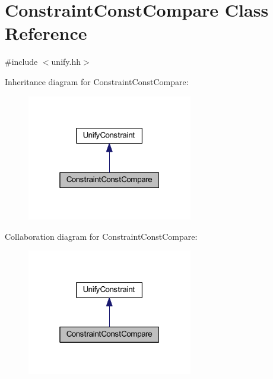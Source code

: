 \hypertarget{class_constraint_const_compare}{}\section{Constraint\+Const\+Compare Class Reference}
\label{class_constraint_const_compare}


{\ttfamily \#include $<$unify.\+hh$>$}



Inheritance diagram for Constraint\+Const\+Compare\+:
\nopagebreak
\begin{figure}[H]
\begin{center}
\leavevmode
\includegraphics[width=205pt]{class_constraint_const_compare__inherit__graph}
\end{center}
\end{figure}


Collaboration diagram for Constraint\+Const\+Compare\+:
\nopagebreak
\begin{figure}[H]
\begin{center}
\leavevmode
\includegraphics[width=205pt]{class_constraint_const_compare__coll__graph}
\end{center}
\end{figure}
